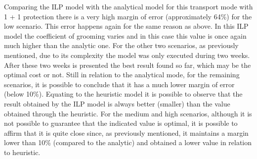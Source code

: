 \vspace{13pt}
Comparing the ILP model with the analytical model for this transport mode with 1 + 1 protection there is a very high margin of error (approximately 64\%) for the low scenario. This error happens again for the same reason as above. In this ILP model the coefficient of grooming varies and in this case this value is once again much higher than the analytic one.
For the other two scenarios, as previously mentioned, due to its complexity the model was only executed during two weeks. After these two weeks is presented the best result found so far, which may be the optimal cost or not.
Still in relation to the analytical mode, for the remaining scenarios, it is possible to conclude that it has a much lower margin of error (below 10\%).
Equating to the heuristic model it is possible to observe that the result obtained by the ILP model is always better (smaller) than the value obtained through the heuristic.
For the medium and high scenarios, although it is not possible to guarantee that the indicated value is optimal, it is possible to affirm that it is quite close since, as previously mentioned, it maintains a margin lower than 10\% (compared to the analytic) and obtained a lower value in relation to heuristic.
